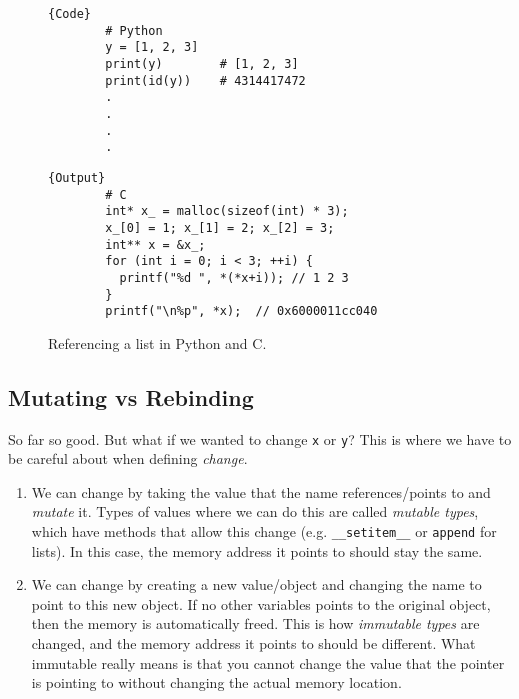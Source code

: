   \begin{figure}[H]
    \centering 
    \begin{minipage}{.5\textwidth}
      \begin{lstlisting}[]{Code}
        # Python 
        y = [1, 2, 3]
        print(y)        # [1, 2, 3]
        print(id(y))    # 4314417472
        .
        .
        .
        .
      \end{lstlisting}
      \end{minipage}
      \hfill
      \begin{minipage}{.49\textwidth}
      \begin{lstlisting}[]{Output}
        # C  
        int* x_ = malloc(sizeof(int) * 3); 
        x_[0] = 1; x_[1] = 2; x_[2] = 3; 
        int** x = &x_; 
        for (int i = 0; i < 3; ++i) {
          printf("%d ", *(*x+i)); // 1 2 3
        }
        printf("\n%p", *x);  // 0x6000011cc040
      \end{lstlisting}
    \end{minipage}
    \caption{Referencing a list in Python and C.} 
    \label{fig:list}
  \end{figure}

\subsection{Mutating vs Rebinding}

  So far so good. But what if we wanted to change \texttt{x} or \texttt{y}? This is where we have to be careful about when defining \textit{change}. 
  \begin{enumerate}
    \item We can change by taking the value that the name references/points to and \textit{mutate} it. Types of values where we can do this are called \textit{mutable types}, which have methods that allow this change (e.g. \texttt{\_\_setitem\_\_} or \texttt{append} for lists). In this case, the memory address it points to should stay the same. 
    \item We can change by creating a new value/object and changing the name to point to this new object. If no other variables points to the original object, then the memory is automatically freed. This is how \textit{immutable types} are changed, and the memory address it points to should be different. What immutable really means is that you cannot change the value that the pointer is pointing to without changing the actual memory location. 
  \end{enumerate}

